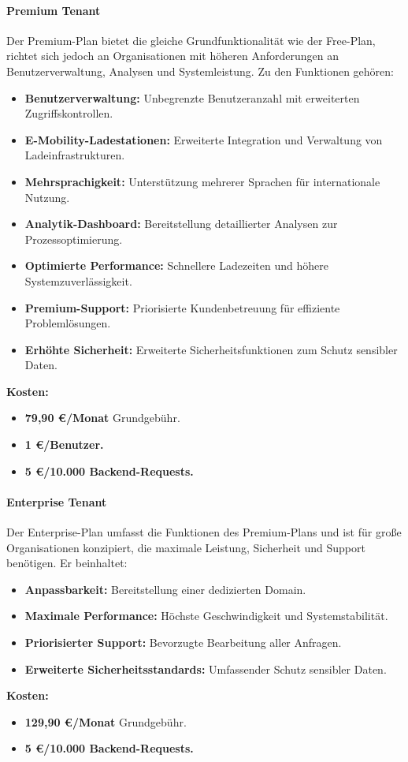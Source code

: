 \paragraph{Premium Tenant}
Der Premium-Plan bietet die gleiche Grundfunktionalität wie der Free-Plan, richtet sich jedoch an Organisationen mit höheren Anforderungen an Benutzerverwaltung, Analysen und Systemleistung.
Zu den Funktionen gehören:
\begin{itemize}
	\item \textbf{Benutzerverwaltung:} Unbegrenzte Benutzeranzahl mit erweiterten Zugriffskontrollen.
	\item \textbf{E-Mobility-Ladestationen:} Erweiterte Integration und Verwaltung von Ladeinfrastrukturen.
	\item \textbf{Mehrsprachigkeit:} Unterstützung mehrerer Sprachen für internationale Nutzung.
	\item \textbf{Analytik-Dashboard:} Bereitstellung detaillierter Analysen zur Prozessoptimierung.
	\item \textbf{Optimierte Performance:} Schnellere Ladezeiten und höhere Systemzuverlässigkeit.
	\item \textbf{Premium-Support:} Priorisierte Kundenbetreuung für effiziente Problemlösungen.
	\item \textbf{Erhöhte Sicherheit:} Erweiterte Sicherheitsfunktionen zum Schutz sensibler Daten.
\end{itemize}
\textbf{Kosten:}
\begin{itemize}
	\item \textbf{79,90 €/Monat} Grundgebühr.
	\item \textbf{1 €/Benutzer.}
	\item \textbf{5 €/10.000 Backend-Requests.}
\end{itemize}

\paragraph{Enterprise Tenant}
Der Enterprise-Plan umfasst die Funktionen des Premium-Plans und ist für große Organisationen konzipiert, die maximale Leistung, Sicherheit und Support benötigen.
Er beinhaltet:
\begin{itemize}
	\item \textbf{Anpassbarkeit:} Bereitstellung einer dedizierten Domain.
	\item \textbf{Maximale Performance:} Höchste Geschwindigkeit und Systemstabilität.
	\item \textbf{Priorisierter Support:} Bevorzugte Bearbeitung aller Anfragen.
	\item \textbf{Erweiterte Sicherheitsstandards:} Umfassender Schutz sensibler Daten.
\end{itemize}
\textbf{Kosten:}
\begin{itemize}
	\item \textbf{129,90 €/Monat} Grundgebühr.
	\item \textbf{5 €/10.000 Backend-Requests.}
\end{itemize}


